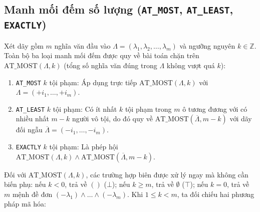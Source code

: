 \subsection{Manh mối đếm số lượng (\texttt{AT\_MOST}, \texttt{AT\_LEAST}, \texttt{EXACTLY})}
\label{subsec:counting_constraints}
Xét dãy gồm $m$ nghĩa văn đầu vào $\Lambda = (\lambda_1, \lambda_2, \dots, \lambda_m)$ và ngưỡng nguyên $k \in \mathbb{Z}$. Toàn bộ ba loại manh mối đếm được quy về bài toán chặn trên $\text{AT\_MOST}(\Lambda, k)$ (tổng số nghĩa văn đúng trong $\Lambda$ không vượt quá $k$):
\begin{enumerate}
    \item \texttt{AT\_MOST} $k$ tội phạm: Áp dụng trực tiếp $\text{AT\_MOST}(\Lambda, k)$ với $\Lambda = (+i_1, \dots, +i_m)$.
    \item \texttt{AT\_LEAST} $k$ tội phạm: Có ít nhất $k$ tội phạm trong $m$ ô tương đương với có nhiều nhất $m - k$ người vô tội, do đó quy về $\text{AT\_MOST}(\overline{\Lambda}, m - k)$ với dãy đối ngẫu $\overline{\Lambda} = (-i_1, \dots, -i_m)$.
    \item \texttt{EXACTLY} $k$ tội phạm: Là phép hội $\text{AT\_MOST}(\Lambda, k) \land \text{AT\_MOST}(\overline{\Lambda}, m - k)$.
\end{enumerate}

Đối với $\text{AT\_MOST}(\Lambda, k)$, các trường hợp biên được xử lý ngay mà không cần biến phụ: nếu $k < 0$, trả về $()$ ($\bot$); nếu $k \ge m$, trả về $\emptyset$ ($\top$); nếu $k = 0$, trả về $m$ mệnh đề đơn $(-\lambda_1) \land \dots \land (-\lambda_m)$. Khi $1 \le k < m$, ta đối chiếu hai phương pháp mã hóa:

